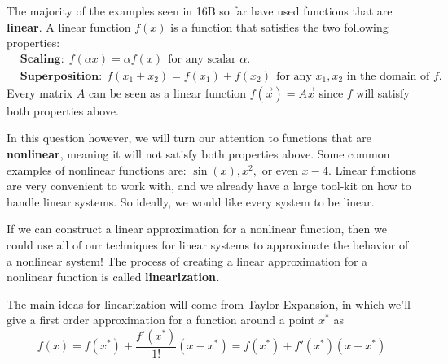 

The majority of the examples seen in 16B so far have used functions that are \textbf{linear}.
A linear function $f(x)$ is a function that satisfies the two following properties:
\begin{align*}
  &\textbf{Scaling:} \ \ f(\alpha x) = \alpha f(x) \ \ \text{for any scalar $\alpha.$} \\
  &\textbf{Superposition:} \ \ f(x_{1} + x_{2}) = f(x_{1}) + f(x_{2}) \ \ \text{for any $x_{1}, x_{2}$ in the domain of $f.$}
\end{align*}
Every matrix $A$ can be seen as a linear function $f(\vec{x}) = A \vec{x}$ since $f$ will satisfy both properties above.

In this question however, we will turn our attention to functions that are \textbf{nonlinear}, meaning it will not satisfy both properties above. 
Some common examples of nonlinear functions are: $\sin(x), x^{2},$ or even $x - 4.$ 
Linear functions are very convenient to work with, and we already have a large tool-kit on how to handle linear systems. 
So ideally, we would like every system to be linear. 

If we can construct a linear approximation for a nonlinear function, then we could use all of our techniques for linear systems to approximate the behavior of a nonlinear system! 
The process of creating a linear approximation for a nonlinear function is called \textbf{linearization.}

The main ideas for linearization will come from Taylor Expansion, in which we'll give a first order approximation for a function around a point $x^{*}$ as
\begin{equation} \label{eqn:ta}
  f(x) = f(x^{*}) + \frac{f'(x^{*})}{1!} (x - x^{*}) = f(x^{*}) + f'(x^{*}) (x - x^{*})
\end{equation}


